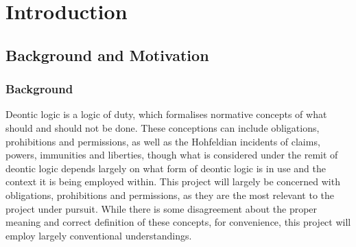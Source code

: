 \documentclass{l4proj}
\begin{document}
\educationalconsent

\tableofcontents













\chapter{Introduction}

\section{Background and Motivation}%
\subsection{Background}
Deontic logic is a logic of duty, which formalises normative concepts of what should and should not be done. These conceptions can include obligations, prohibitions and permissions, as well as the Hohfeldian incidents\cite{Hohfeld} of claims, powers, immunities and liberties, though what is considered under the remit of deontic logic depends largely on what form of deontic logic is in use and the context it is being employed within. This project will largely be concerned with obligations, prohibitions and permissions, as they are the most relevant to the project under pursuit. While there is some disagreement about the proper meaning and correct definition of these concepts, for convenience, this project will employ largely conventional understandings. 
\end{document}
